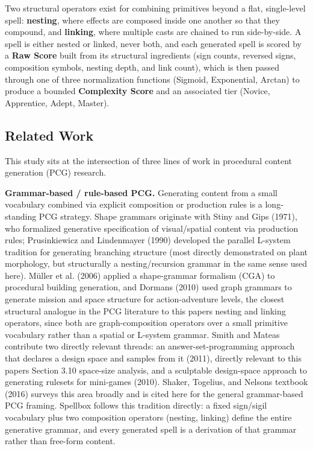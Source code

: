 \documentclass[
  10pt,
  twocolumn]{article}
\begin{document}
Two structural operators exist for combining primitives beyond a flat,
single-level spell: \textbf{nesting}, where effects are composed inside
one another so that they compound, and \textbf{linking}, where multiple
casts are chained to run side-by-side. A spell is either nested or
linked, never both, and each generated spell is scored by a \textbf{Raw
Score} built from its structural ingredients (sign counts, reversed
signs, composition symbols, nesting depth, and link count), which is
then passed through one of three normalization functions (Sigmoid,
Exponential, Arctan) to produce a bounded \textbf{Complexity Score} and
an associated tier (Novice, Apprentice, Adept, Master).

\subsection{Related Work}\label{related-work}

This study sits at the intersection of three lines of work in procedural
content generation (PCG) research.

\textbf{Grammar-based / rule-based PCG.} Generating content from a small
vocabulary combined via explicit composition or production rules is a
long-standing PCG strategy. Shape grammars originate with Stiny and Gips
(1971), who formalized generative specification of visual/spatial
content via production rules; Prusinkiewicz and Lindenmayer (1990)
developed the parallel L-system tradition for generating branching
structure (most directly demonstrated on plant morphology, but
structurally a nesting/recursion grammar in the same sense used here).
Müller et al. (2006) applied a shape-grammar formalism (CGA) to
procedural building generation, and Dormans (2010) used graph grammars
to generate mission and space structure for action-adventure levels, the
closest structural analogue in the PCG literature to this
paper\textquotesingle s nesting and linking operators, since both are
graph-composition operators over a small primitive vocabulary rather
than a spatial or L-system grammar. Smith and Mateas contribute two
directly relevant threads: an answer-set-programming approach that
declares a design space and samples from it (2011), directly relevant to
this paper\textquotesingle s Section 3.10 space-size analysis, and a
sculptable design-space approach to generating rulesets for mini-games
(2010). Shaker, Togelius, and Nelson\textquotesingle s textbook (2016)
surveys this area broadly and is cited here for the general
grammar-based PCG framing. Spellbox follows this tradition directly: a
fixed sign/sigil vocabulary plus two composition operators (nesting,
linking) define the entire generative grammar, and every generated spell
is a derivation of that grammar rather than free-form content.
\end{document}
